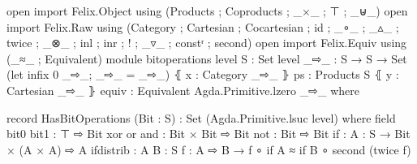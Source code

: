 


\begin{code}



open import Felix.Object using (Products ;  Coproducts ;   _×_ ; ⊤ ; _⊎_)
open import Felix.Raw using (Category ; Cartesian ; Cocartesian ; id ; _∘_ ; _▵_ ; twice ; _⊗_ ; inl ; inr ; ! ; _▿_ ; constʳ ; second)
open import Felix.Equiv using (_≈_ ; Equivalent)
module bitoperations
       {level}
       {S : Set level}
     {_⇨_ : S  → S  → Set} (let infix 0 _⇨_; _⇨_ = _⇨_)
     ⦃ x : Category _⇨_ ⦄
         {{ps : Products S}}
     ⦃ y : Cartesian _⇨_ ⦄
         {{ equiv : Equivalent Agda.Primitive.lzero _⇨_ }}
     where



record HasBitOperations (Bit : S) : Set (Agda.Primitive.lsuc level) where
  field
    bit0 bit1 : ⊤ ⇨ Bit
    xor or and : Bit × Bit  ⇨ Bit
    not : Bit ⇨ Bit
    if : {A : S } →  Bit × (A × A) ⇨ A
    ifdistrib : {A B : S} {f : A ⇨ B } →  f ∘ if {A} ≈ if {B} ∘ second (twice f)


\end{code}
